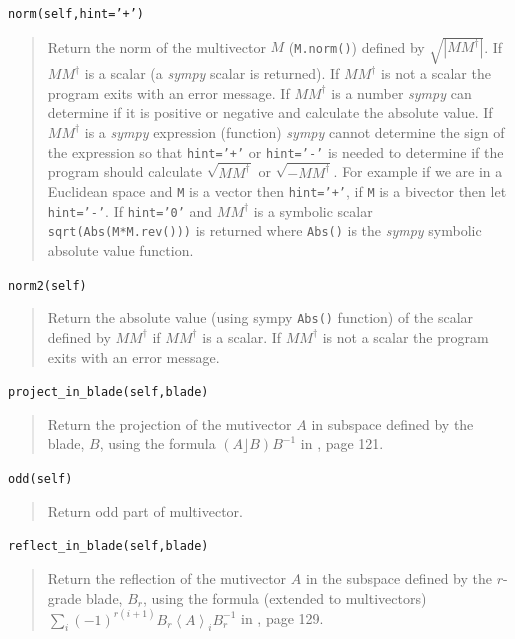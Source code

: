 \documentclass[12pt]{report}
\newcommand{\lp}{\left (}
\newcommand{\rp}{\right )}
\newcommand{\abs}[1]{\left |{#1}\right |}
\newcommand{\R}{\dagger}
\newcommand{\grade}[1]{\left < {#1} \right >}
\newcommand{\paren}[1]{\lp {#1} \rp}
\newcommand{\T}[1]{\texttt{#1}}
\begin{document}
\T{norm(self,hint='+')}
\begin{quote}
   Return the norm of the multivector $M$ (\T{M.norm()}) defined by $\sqrt{\abs{MM^{\R}}}$.  If $MM^{\R}$ is a scalar (a \emph{sympy} scalar
   is returned).  If $MM^{\R}$ is not a scalar the program exits with an error message. If $MM^{\R}$ is a number \emph{sympy} can determine
   if it is positive or negative and calculate the absolute value.  If $MM^{\R}$ is a \emph{sympy} expression (function) \emph{sympy} cannot
   determine the sign of the expression so that \T{hint='+'} or \T{hint='-'} is needed to determine if the program should calculate
   $\sqrt{MM^{\R}}$ or $\sqrt{-MM^{\R}}$. For example if we are in a Euclidean space and \T{M} is a vector then \T{hint='+'}, if
   \T{M} is a bivector then let \T{hint='-'}. If \T{hint='0'} and $MM^{\R}$ is a symbolic scalar \T{sqrt(Abs(M*M.rev()))} is returned 
   where \T{Abs()} is the \emph{sympy} symbolic absolute value function.
\end{quote}

\T{norm2(self)}
\begin{quote}
   Return the absolute value (using sympy \T{Abs()} function) of the scalar defined by $MM^{\R}$ if $MM^{\R}$ is a scalar.  If 
   $MM^{\R}$ is not a scalar the program exits with an error message.
\end{quote}

\T{project\_in\_blade(self,blade)}
\begin{quote}
    Return the projection of the mutivector $A$ in subspace defined by the blade, $B$, using the formula
    $\paren{A\rfloor B}B^{-1} $ in \cite{Macdonald 1}, page 121.
\end{quote}

\T{odd(self)}
\begin{quote}
	Return odd part of multivector.
\end{quote}

\T{reflect\_in\_blade(self,blade)}
\begin{quote}
    Return the reflection of the mutivector $A$ in the subspace defined by the $r$-grade blade, $B_{r}$, using the formula
    (extended to multivectors) $\sum_{i} \paren{-1}^{r\paren{i+1}}{B}_{r}\grade{A}_{i}B_{r}^{-1}$ in
    \cite{Macdonald 1}, page 129.
\end{quote}
\end{document}
